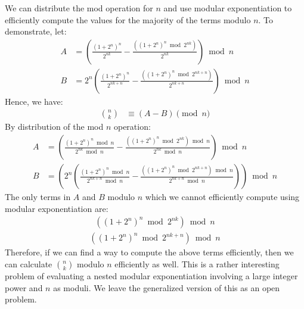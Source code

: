 \documentclass{article}
\theoremstyle{plain}
\theoremstyle{definition}
\begin{document}
We can distribute the mod operation for $n$ and use modular exponentiation to efficiently compute the values for the majority of the terms modulo $n$. To demonstrate, let:
\begin{align}
A &= \left(\frac{(1 + 2^{n})^{n}}{2^{nk}} - \frac{((1 + 2^{n})^{n} \bmod{2^{nk}})}{2^{nk}}\right) \bmod{n} \\
B &= 2^{n} \left( \frac{(1 + 2^{n})^{n}}{2^{nk+n}} - \frac{((1 + 2^{n})^{n} \bmod{2^{nk+n}})}{2^{nk+n}} \right) \bmod{n}
\end{align}
Hence, we have:
\begin{align}
\binom{n}{k} &\equiv (A - B) \pmod{n}
\end{align}
By distribution of the mod \( n \) operation:
\begin{align}
A &= \left(\frac{(1 + 2^{n})^{n} \bmod{n}}{2^{nk} \bmod{n}} - \frac{((1 + 2^{n})^{n} \bmod{2^{nk}}) \bmod{n}}{2^{nk} \bmod{n}}\right) \bmod{n} \\
B &= \left(2^{n} \left( \frac{(1 + 2^{n})^{n} \bmod{n}}{2^{nk+n} \bmod{n}} - \frac{((1 + 2^{n})^{n} \bmod{2^{nk+n}}) \bmod{n}}{2^{nk+n} \bmod{n}} \right)\right) \bmod{n}
\end{align}
The only terms in \( A \) and \( B \) modulo \( n \) which we cannot efficiently compute using modular exponentiation are:
\begin{align}
    \left((1 + 2^{n})^{n} \bmod{2^{nk}}\right) \bmod{n}
\end{align}
\begin{align}
    \left((1 + 2^{n})^{n} \bmod{2^{nk+n}}\right) \bmod{n}
\end{align}
Therefore, if we can find a way to compute the above terms efficiently, then we can calculate \( \binom{n}{k} \) modulo \( n \) efficiently as well. This is a rather interesting problem of evaluating a nested modular exponentiation involving a large integer power and \( n \) as moduli. We leave the generalized version of this as an open problem.

\end{document}
